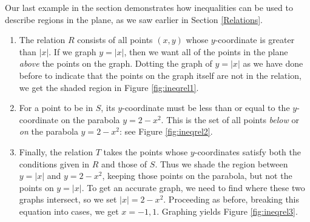 \pagebreak

Our last example in the section demonstrates how inequalities can be used to describe regions in the plane, as we saw earlier in Section \ref{Relations}.

\medskip

{
\begin{enumerate}

\item  The relation $R$ consists of all points $(x,y)$ whose $y$-coordinate is greater than $|x|$.  If we graph $y=|x|$, then we want all of the points in the plane \emph{above} the points on the graph.  Dotting the graph of $y=|x|$ as we have done before to indicate that the points on the graph itself are not in the relation, we get the shaded region in Figure \ref{fig:ineqrel1}.



\item  For a point to be in $S$, its $y$-coordinate must be less than or equal to the $y$-coordinate on the parabola $y=2-x^2$.  This is the set of all points \emph{below} or \emph{on} the parabola $y=2-x^2$: see Figure \ref{fig:ineqrel2}.



\item  Finally, the relation $T$ takes the points whose $y$-coordinates satisfy both the conditions given in $R$ and those of $S$.  Thus we shade the region between $y=|x|$ and $y=2-x^2$, keeping those points on the parabola, but not the points on $y=|x|$.  To get an accurate graph, we need to find where these two graphs intersect, so we set $|x| = 2-x^2$.  Proceeding as before, breaking this equation into cases, we get $x=-1,1$.  Graphing yields Figure \ref{fig:ineqrel3}.

\end{enumerate}
}


